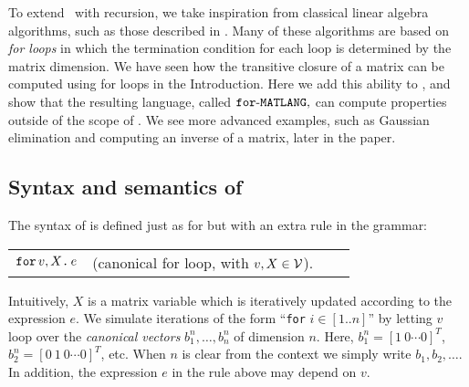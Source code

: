 


To extend \lang\ with recursion, we take inspiration from classical linear algebra algorithms, such as those described in \cite{num}. Many of these algorithms are based on \textit{for loops} in which the termination condition for each loop is determined by the matrix dimension. We have seen how the transitive closure of a matrix can be computed using for loops in the Introduction. Here we add this ability to \lang, and show that the resulting language, called $\texttt{for}\text{-}\texttt{MATLANG},$ can compute properties outside of the scope of \lang. We see more advanced examples, such as Gaussian elimination and computing an inverse of a matrix, later in the paper. 

\subsection{Syntax and semantics of \langfor} The syntax of \langfor is defined just as for \lang but with an extra rule in the grammar:
\medskip

\begin{tabular}{lcll}
 $\texttt{for}\, v,X \texttt{.}\, e$ & (canonical for loop, with $v, X \in \mathcal{V}$). 
\end{tabular}

\medskip
\noindent Intuitively, $X$ is a matrix variable which is iteratively updated according to the expression $e$. We simulate iterations of the form ``\texttt{for} $i\in [1..n]$'' by letting $v$ loop over the \textit{canonical vectors} $b_1^n,\ldots,b_n^n$ of dimension $n$. Here,
%
$b_1^n = [1\ 0 \cdots 0]^T$, $b_2^n = [0\ 1\ 0 \cdots 0]^T$, etc. When $n$ is clear from the context we simply write $b_1,b_2,\ldots$. In addition, the expression $e$ in the rule above may depend on $v$. 


